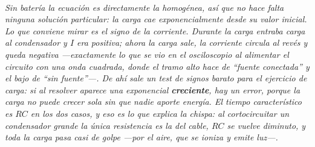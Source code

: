 \begin{center}
\\[0.5em]
{\small\itshape Sin batería la ecuación es directamente la homogénea, así que no
hace falta ninguna solución particular: la carga cae exponencialmente desde su
valor inicial. Lo que conviene mirar es el signo de la corriente. Durante la
carga entraba carga al condensador y $I$ era positiva; ahora la carga sale, la
corriente circula al revés y queda negativa ---exactamente lo que se vio en el
osciloscopio al alimentar el circuito con una onda cuadrada, donde el tramo alto
hace de \enquote{fuente conectada} y el bajo de \enquote{sin fuente}---. De ahí
sale un test de signos barato para el ejercicio de carga: si al resolver aparece
una exponencial \textbf{creciente}, hay un error, porque la carga no puede
crecer sola sin que nadie aporte energía. El tiempo característico es $RC$ en
los dos casos, y eso es lo que explica la chispa: al cortocircuitar un
condensador grande la única resistencia es la del cable, $RC$ se vuelve
diminuto, y toda la carga pasa casi de golpe ---por el aire, que se ioniza y
emite luz---.}
\end{center}
